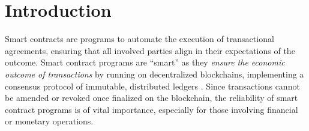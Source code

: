 \section{Introduction} \label{sec:intro}





Smart contracts are programs to automate the execution of transactional agreements, ensuring that all involved parties align in their expectations of the outcome. 
Smart contract programs are ``smart'' as they
\emph{ensure the economic outcome of transactions} by running on decentralized blockchains, 
implementing a consensus protocol of immutable, distributed ledgers \cite{nakamoto2008bitcoin}.
Since transactions cannot be amended or revoked once finalized on the blockchain,
the reliability of smart contract programs is of vital importance, especially
for those involving financial or monetary operations.


